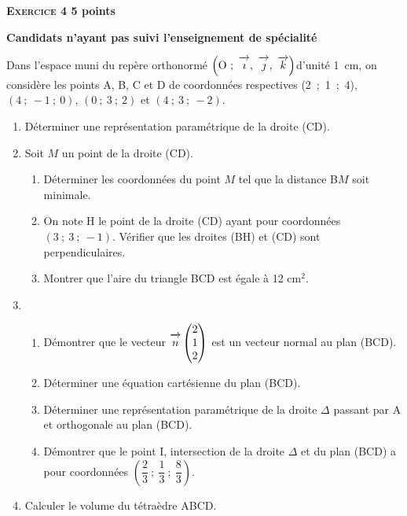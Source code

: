 \documentclass[10pt]{article}
\newcommand{\vect}[1]{\overrightarrow{\,\mathstrut#1\,}}
\def\Oijk{$\left(\text{O}~;~\vect{\imath},~\vect{\jmath},~\vect{k}\right)$}
\begin{document}
\vspace{0,5cm}

\textbf{\textsc{Exercice 4} \hfill 5 points}
 
\textbf{Candidats n'ayant pas suivi l'enseignement de spécialité}

\medskip

Dans l'espace muni du repère orthonormé \Oijk d'unité 1~cm, on considère les points
A, B, C et D de coordonnées respectives (2~;~1~;~4), $(4~;~-1~;~0)$, $(0~;~3~;~2)$ et $(4~;~3~;~-2)$.

\medskip

\begin{enumerate}
\item Déterminer une représentation paramétrique de la droite (CD).
\item Soit $M$ un point de la droite (CD).
	\begin{enumerate}
		\item Déterminer les coordonnées du point $M$ tel que la distance B$M$ soit minimale.
		\item On note H le point de la droite (CD) ayant pour coordonnées $(3~;~3~;~- 1)$.
Vérifier que les droites (BH) et (CD) sont perpendiculaires.
		\item Montrer que l'aire du triangle BCD est égale à 12 cm$^2$.
	\end{enumerate}
\item 
	\begin{enumerate}
		\item Démontrer que le vecteur $\vect{n}\begin{pmatrix}2\\1\\2\end{pmatrix}$  est un vecteur normal au plan (BCD).
		\item Déterminer une équation cartésienne du plan (BCD).
		\item Déterminer une représentation paramétrique de la droite $\Delta$ passant par A et orthogonale
au plan (BCD).
		\item Démontrer que le point I, intersection de la droite $\Delta$ et du plan (BCD) a pour
coordonnées $\left(\dfrac{2}{3}~;~\dfrac{1}{3}~;~\dfrac{8}{3}\right)$.
	\end{enumerate}
\item  Calculer le volume du tétraèdre ABCD.
\end{enumerate}

\vspace{0,5cm}
\end{document}
